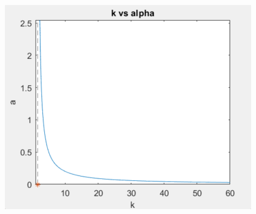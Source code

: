 \documentclass{beamer}
\begin{document}
\begin{frame}
\begin{minipage}{0.66\textwidth}
\begin{figure}
\begin{minipage}{0.49\textwidth}
		\end{minipage}\hspace{-1cm}
		\begin{minipage}{0.49\textwidth}
			{\includegraphics[scale=0.3]{2022-06-09-17-31-10.png}}%
		\end{minipage}
\end{figure}
\end{minipage}
\end{frame}
\end{document}

